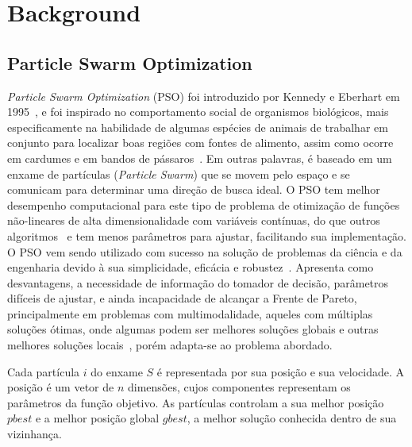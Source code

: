 \section{Background}
\label{sec:background}

\subsection{Particle Swarm Optimization}
\label{subsec:PSO}
\textit{Particle Swarm Optimization} (PSO) foi introduzido por Kennedy e Eberhart em 1995~\cite{eberhart1995}, e foi inspirado no comportamento social de organismos biológicos, mais especificamente na habilidade de algumas espécies de animais de trabalhar em conjunto para localizar boas regiões com fontes de alimento, assim como ocorre em cardumes e em bandos de pássaros~\cite{bratton2007}. Em outras palavras, é baseado em um enxame de partículas (\emph{Particle Swarm}) que se movem pelo espaço e se comunicam para determinar uma direção de busca ideal. O PSO tem melhor desempenho computacional para este tipo de problema de otimização de funções não-lineares de alta dimensionalidade com variáveis contínuas, do que outros algoritmos~\cite{eberhart1995,bratton2007,alrashidi2009} e tem menos parâmetros para ajustar, facilitando sua implementação. O PSO vem sendo utilizado com sucesso na solução de problemas da ciência e da engenharia devido à sua simplicidade, eficácia e robustez~\cite{fukuyama1999, ourique2002, sousa2004,van2006,engelbrecht2007, alrashidi2009,rodriguez2014,al2015}. Apresenta como desvantagens, a necessidade de informação do tomador de decisão, parâmetros difíceis de ajustar, e ainda incapacidade de alcançar a Frente de Pareto, principalmente em problemas com multimodalidade, aqueles com múltiplas soluções ótimas, onde algumas podem ser melhores soluções globais e outras melhores soluções locais~\cite{figueiredo2013}, porém adapta-se ao problema abordado.

Cada partícula $ i $ do enxame $ S $ é representada por sua posição e sua velocidade. A posição é um vetor de $ n $ dimensões, cujos componentes representam os parâmetros da função objetivo. As partículas controlam a sua melhor posição $ pbest $ e a melhor posição global $ gbest $, a melhor solução conhecida dentro de sua vizinhança.

